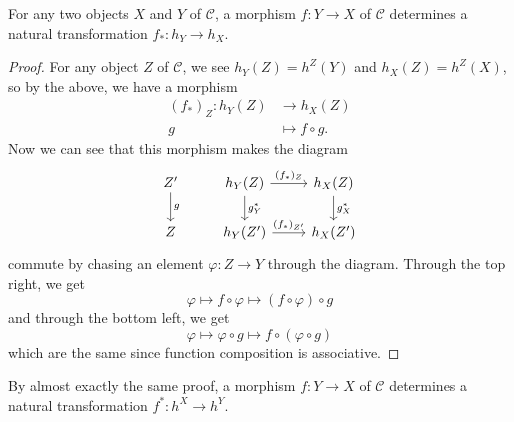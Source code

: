 \documentclass[10pt]{amsart}
\begin{document}
\begin{prop}\label{p.1}
  For any two objects $X$ and $Y$ of $\mathscr{C}$, a morphism $f : Y \rightarrow X$ of $\mathscr{C}$ determines a natural transformation $f_* : h_Y \rightarrow h_X$.
  
  \begin{proof}
    For any object $Z$ of $\mathscr{C}$, we see $h_Y(Z) = h^Z(Y)$ and $h_X(Z) = h^Z(X)$, so by the above, we have a morphism
    \begin{align*}
      (f_*)_Z \colon h_Y(Z) &\rightarrow h_X(Z)\\
      g &\mapsto f \circ g.
    \end{align*}
    Now we can see that this morphism makes the diagram
    $$\begin{tikzcd}
      Z^\prime\arrow{d}{g} & h_Y(Z)\arrow{d}{g^*_Y}\arrow{r}{(f_*)_Z} & h_X(Z)\arrow{d}{g^*_{X}}\\ 
      Z & h_Y(Z^\prime) \arrow{r}{(f_*)_{Z^\prime}} &  h_X(Z^\prime)
    \end{tikzcd}$$
    commute by chasing an element $\varphi : Z \rightarrow Y$ through the diagram.
    Through the top right, we get
    $$\varphi \mapsto f \circ \varphi \mapsto (f \circ \varphi) \circ g $$
    and through the bottom left, we get
    $$\varphi \mapsto \varphi \circ g \mapsto f \circ (\varphi \circ g) $$
    which are the same since function composition is associative.
  \end{proof}
\end{prop}

\begin{rmk}
  By almost exactly the same proof, a morphism $f : Y \rightarrow X$ of $\mathscr{C}$ determines a natural transformation $f^* : h^X \rightarrow h^Y$.
\end{rmk}
\end{document}
